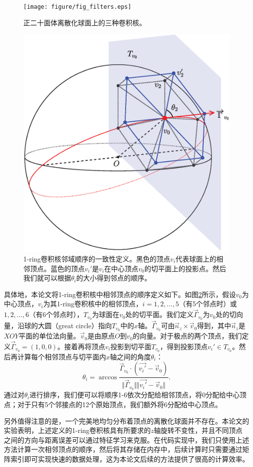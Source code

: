 \begin{figure}[!t]
	\centering
	\texttt{[image: figure/fig\_filters.eps]}
	\caption{正二十面体离散化球面上的三种卷积核。}
	\label{fig:fig_filters}
\end{figure}

\begin{figure}[h]
	\centering
	\includegraphics[width=0.5\linewidth]{figure/figure_1_ring_projection_on_tangent_plane.eps}
	\caption{1-ring卷积核邻域顺序的一致性定义。黑色的顶点$v_i$代表球面上的相邻顶点。蓝色的顶点$v_i'$是$v_i$在中心顶点$v_0$的切平面上的投影点。然后我们就可以根据$\theta_i$的大小得到邻点的顺序。}
	\label{fig:figure_1_ring_projection_on_tangent_plane}
\end{figure}

具体地，本论文将1-ring卷积核中相邻顶点的顺序定义如下。如图\ref{fig:figure_1_ring_projection_on_tangent_plane}所示，假设$v_0$为中心顶点，$v_i$为其1-ring卷积核中的相邻顶点，$i=1,2,\dots,5$（有5个邻点时）或$1,2,\dots,6$（有6个邻点时），$T_{v_0}$为球面在$v_0$处的切平面。我们定义$\vec{\Gamma}_{v_0}$为$v_0$处的切向量，沿球的大圆（great circle）指向$T_{v_0}$中的$x$轴。$\vec{\Gamma}_{v_0}$可由$\vec{n}_z\times \vec{v}_0$得到，其中$\vec{n}_z$是$XOY$平面的单位法向量。$\vec{v}_0$是由原点$O$到$v_0$的向量。对于极点的两个顶点，我们定义$\vec{\Gamma}_{v_0}=(1,0,0)$。接着再将顶点$v_i$投影到切平面$T_{v_0}$，得到投影顶点$v_i'\in T_{v_0}$。然后再计算每个相邻顶点与切平面内$x$轴之间的角度$\theta_i$：
\begin{equation}
\theta_i=\arccos{\frac{\vec{\Gamma}_{v_0} \cdot (\vec{v_i'}-\vec{v}_0)}{\Vert{\vec{\Gamma}_{v_0}}\Vert\Vert{\vec{v_i'}-\vec{v}_0}\Vert}}.
\end{equation}
通过对$\theta_i$进行排序，我们便可以将顺序1-6依次分配给相邻顶点，将0分配给中心顶点；对于只有5个邻接点的12个原始顶点，我们额外将6分配给中心顶点。

另外值得注意的是，一个完美地均匀分布着顶点的离散化球面并不存在\cite{lee2019spherephd}。本论文的实验表明，上述定义的1-ring卷积核具有所要求的$z$轴旋转不变性，并且不同顶点之间的方向与距离误差可以通过特征学习来克服\cite{lee2019spherephd,liu2018deep,zhao2019spherical_ipmi,jiang2018spherical}。在代码实现中，我们只使用上述方法计算一次相邻顶点的顺序，然后将其存储在内存中，后续计算时只需要通过矩阵索引即可实现快速的数据处理，这为本论文后续的方法提供了很高的计算效率。

